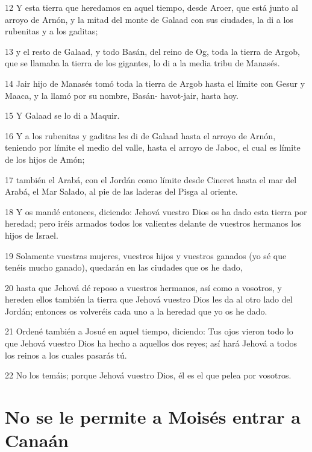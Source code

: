 \par 12 Y esta tierra que heredamos en aquel tiempo, desde Aroer, que está junto al arroyo de Arnón, y la mitad del monte de Galaad con sus ciudades, la di a los rubenitas y a los gaditas;
\par 13 y el resto de Galaad, y todo Basán, del reino de Og, toda la tierra de Argob, que se llamaba la tierra de los gigantes, lo di a la media tribu de Manasés.
\par 14 Jair hijo de Manasés tomó toda la tierra de Argob hasta el límite con Gesur y Maaca, y la llamó por su nombre, Basán- havot-jair, hasta hoy.
\par 15 Y Galaad se lo di a Maquir.
\par 16 Y a los rubenitas y gaditas les di de Galaad hasta el arroyo de Arnón, teniendo por límite el medio del valle, hasta el arroyo de Jaboc, el cual es límite de los hijos de Amón;
\par 17 también el Arabá, con el Jordán como límite desde Cineret hasta el mar del Arabá, el Mar Salado, al pie de las laderas del Pisga al oriente.
\par 18 Y os mandé entonces, diciendo: Jehová vuestro Dios os ha dado esta tierra por heredad; pero iréis armados todos los valientes delante de vuestros hermanos los hijos de Israel.
\par 19 Solamente vuestras mujeres, vuestros hijos y vuestros ganados (yo sé que tenéis mucho ganado), quedarán en las ciudades que os he dado,
\par 20 hasta que Jehová dé reposo a vuestros hermanos, así como a vosotros, y hereden ellos también la tierra que Jehová vuestro Dios les da al otro lado del Jordán; entonces os volveréis cada uno a la heredad que yo os he dado.
\par 21 Ordené también a Josué en aquel tiempo, diciendo: Tus ojos vieron todo lo que Jehová vuestro Dios ha hecho a aquellos dos reyes; así hará Jehová a todos los reinos a los cuales pasarás tú.
\par 22 No los temáis; porque Jehová vuestro Dios, él es el que pelea por vosotros.

\section{No se le permite a Moisés entrar a Canaán}

